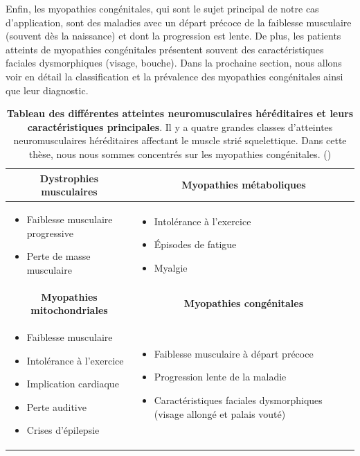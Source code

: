 Enfin, les myopathies congénitales, qui sont le sujet principal de notre cas d'application, sont des maladies avec un départ précoce de la faiblesse musculaire (souvent dès la naissance) et dont la progression est lente. De plus, les patients atteints de myopathies congénitales présentent souvent des caractéristiques faciales dysmorphiques (visage, bouche). Dans la prochaine section, nous allons voir en détail la classification et la prévalence des myopathies congénitales ainsi que leur diagnostic.
\begin{table}[!ht]
\centering
\begin{tabularx}{\textwidth}{|X|X|}
 \hline
\multicolumn{1}{|c|}{\textbf{Dystrophies musculaires}} & \multicolumn{1}{|c|}{\textbf{Myopathies métaboliques}} \\
\hline
\begin{itemize}
\item Faiblesse musculaire progressive
\item Perte de masse musculaire
\end{itemize} &
\begin{itemize}
\item Intolérance à l'exercice
\item Épisodes de fatigue
\item Myalgie
\end{itemize} \\
\hline

\multicolumn{1}{|c|}{\textbf{Myopathies mitochondriales}} & \multicolumn{1}{|c|}{\textbf{Myopathies congénitales}} \\
\hline
\begin{itemize}
\item Faiblesse musculaire
\item Intolérance à l'exercice
\item Implication cardiaque
\item Perte auditive
\item Crises d'épilepsie
\end{itemize} &
\begin{itemize}
\item Faiblesse musculaire à départ précoce
\item Progression lente de la maladie
\item Caractéristiques faciales dysmorphiques (visage allongé et palais vouté)
\end{itemize} \\
\hline
\end{tabularx}

\caption[Tableau des différentes atteintes neuromusculaires et leurs caractéristiques principales]{\textbf{Tableau des différentes atteintes neuromusculaires héréditaires et leurs caractéristiques principales}. Il y a quatre grandes classes d'atteintes neuromusculaires héréditaires affectant le muscle strié squelettique. Dans cette thèse, nous nous sommes concentrés sur les myopathies congénitales. (\cite{lornage_identification_2019})}
\label{table:nmd}
\end{table}

